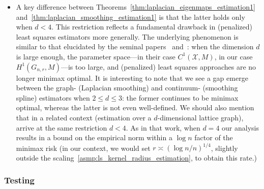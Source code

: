 \documentclass{article}
\newcommand{\1}{\mathbf{1}}
\newcommand{\Xset}{\mathcal{X}}
\theoremstyle{alden}
\theoremstyle{aldenthm}
\theoremstyle{definition}
\theoremstyle{remark}
\begin{document}
\begin{itemize}
	\item A key difference between Theorems~\ref{thm:laplacian_eigenmaps_estimation1} and~\ref{thm:laplacian_smoothing_estimation1} is that the latter holds only when $d < 4$. This restriction reflects a fundamental drawback in (penalized) least squares estimators more generally. The underlying phenomenon is similar to that elucidated by the seminal papers~\cite{birge1993} and~\cite{birge1998}: when the dimension $d$ is large enough, the parameter space---in their case $C^1(\Xset,M)$, in our case $H^1(G_{n,r},M)$---is too large, and (penalized) least squares approaches are no longer minimax optimal. It is interesting to note that we see a gap emerge between the graph- (Laplacian smoothing) and continuum- (smoothing spline) estimators when $2 \leq d \leq 3$: the former continues to be minimax optimal, whereas the latter is not even well-defined. We should also mention that in a related context (estimation over a $d$-dimensional lattice graph), \cite{sadhanala2016} arrive at the same restriction $d < 4$. As in that work, when $d = 4$ our analysis results in a bound on the empirical norm within a $\log n$ factor of the minimax risk (in our context, we would set $r \asymp (\log n/n)^{1/4}$, slightly outside the scaling~\ref{asmp:ls_kernel_radius_estimation}, to obtain this rate.)
\end{itemize}

\subsubsection{Testing}
\end{document}
